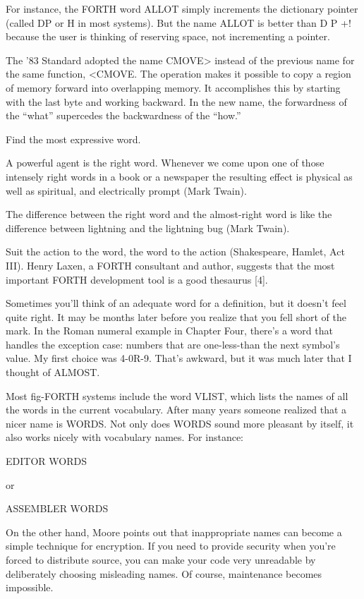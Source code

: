 For instance, the FORTH word ALLOT simply increments the dictionary
pointer (called DP or H in most systems).  But the name ALLOT
is better than D P +! because the user is thinking of reserving space, not
incrementing a pointer.

The '83 Standard adopted the name CMOVE> instead of the previous
name for the same function, <CMOVE.  The operation makes it
possible to copy a region of memory forward into overlapping memory.  It
accomplishes this by starting with the last byte and working backward.
In the new name, the forwardness of the ``what'' supercedes the
backwardness of the ``how.''

\begin{tip}
Find the most expressive word.
\end{tip}
A powerful agent is the right word.  Whenever we come upon one of those intensely
right words in a book or a newspaper the resulting effect is physical
as well as spiritual, and electrically prompt (Mark Twain).

The difference between the right word and the almost-right word is like the
difference between lightning and the lightning bug (Mark Twain).

Suit the action to the word, the word to the action (Shakespeare, Hamlet,
Act III).
Henry Laxen, a FORTH consultant and author, suggests that the most
important FORTH development tool is a good thesaurus [4].

Sometimes you'll think of an adequate word for a definition, but it
doesn't feel quite right.  It may be months later before you realize that
you fell short of the mark.  In the Roman numeral example in Chapter
Four, there's a word that handles the exception case: numbers that are
one-less-than the next symbol's value.  My first choice was 4-0R-9.  That's
awkward, but it was much later that I thought of ALMOST.

Most fig-FORTH systems include the word VLIST, which lists the
names of all the words in the current vocabulary.  After many years someone
realized that a nicer name is WORDS.  Not only does WORDS sound
more pleasant by itself, it also works nicely with vocabulary names.  For
instance:
\begin{Code}
EDITOR WORDS
\end{Code}
or
\begin{Code}
ASSEMBLER WORDS
\end{Code}
On the other hand, Moore points out that inappropriate names can
become a simple technique for encryption.  If you need to provide security
when you're forced to distribute source, you can make your code very
unreadable by deliberately choosing misleading names.  Of course, maintenance
becomes impossible.


